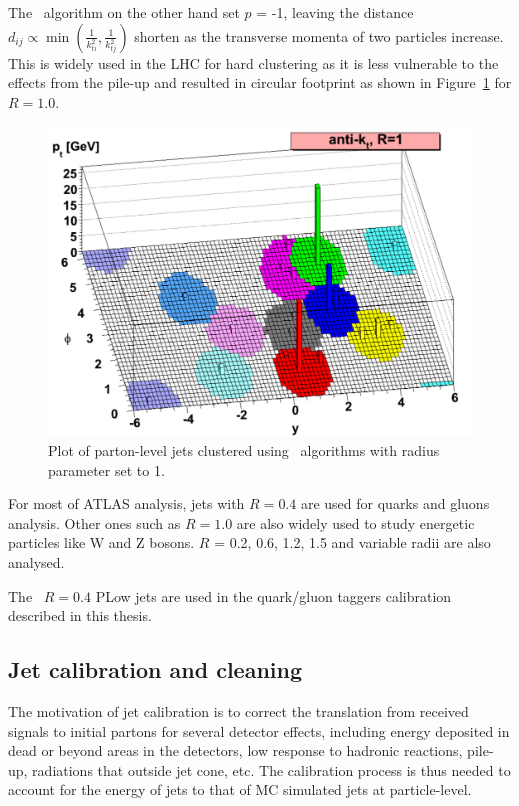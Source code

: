 The  \antikt~algorithm on the other hand set $p$ = -1, leaving the distance $d_{i j} \propto \min \left(\frac{1}{k_{t i}^2}, \frac{1}{k_{t j}^2}\right)$ shorten as the transverse momenta of two particles increase. This is widely used in the LHC for hard clustering as it is less vulnerable to the effects from the pile-up and resulted in circular footprint as shown in Figure~\ref{Fig.kt} for $R = 1.0$.

\begin{figure}[htb] 
	\centering  
	\includegraphics[width=12cm]{./fig/kt.png}	\caption{Plot of parton-level jets clustered using  \antikt~algorithms with radius parameter set to 1.}
	\label{Fig.kt}
\end{figure}

For most of ATLAS analysis, jets with $R = 0.4$ are used for quarks and gluons analysis. Other ones such as $R = 1.0$ are also widely used to study energetic particles like W and Z bosons. $R$ = 0.2, 0.6, 1.2, 1.5 and variable radii are also analysed.

The \antikt~$R = 0.4$ PLow jets are used in the quark/gluon taggers calibration described in this thesis.



\subsection{Jet calibration and cleaning}
\label{sec:4.2}

The motivation of jet calibration is to correct the translation from received signals to initial partons for several detector effects, including energy deposited in dead or beyond areas in the detectors, low response to hadronic reactions, pile-up, radiations that outside jet cone, etc. The calibration process is thus needed to account for the energy of jets to that of MC simulated jets at particle-level.

